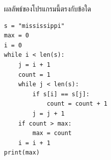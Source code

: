 \question ผลลัพธ์ของโปรแกรมนี้ตรงกับข้อใด
\begin{verbatim}
s = "mississippi"
max = 0
i = 0
while i < len(s):
    j = i + 1
    count = 1
    while j < len(s):
        if s[i] == s[j]:
            count = count + 1
        j = j + 1
    if count > max:
        max = count
    i = i + 1
print(max)
\end{verbatim}
